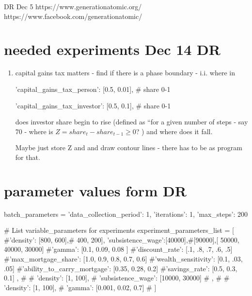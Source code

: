 DR Dec 5
https://www.generationatomic.org/
https://www.facebook.com/generationatomic/
\section{needed experiments Dec 14 DR}
\begin{enumerate}
    \item capital gains tax matters - find if there is a phase boundary - i.i. where in 

            'capital_gains_tax_person': [0.5, 0.01], # share 0-1

            'capital_gains_tax_investor': [0.5, 0.1], # share 0-1

            does investor share begin to rise (defined as ``for a given number of steps - say 70 - where is $Z=share_t - share_{t-1} \ge 0$? ) and where does it fall.

Maybe just store Z and and draw contour lines - there has to be as program for that.
\end{enumerate}
\section{parameter values form DR}
batch_parameters = {
            'data_collection_period': 1,
            'iterations': 1,
            'max_steps': 200
}

# List variable_parameters for experiments
    experiment_parameters_list = [
         {
            #'density': [800, 600],# 400, 200],
            'subsistence_wage':[40000],#[90000],[ 50000, 40000, 30000]
            #'gamma': [0.1, 0.09, 0.08 ]
            #'discount_rate': [.1, .8, .7, .6, .5]
            #'max_mortgage_share': [1.0, 0.9, 0.8, 0.7, 0.6]
            #'wealth_sensitivity': [0.1, .03, .05]
            #'ability_to_carry_mortgage': [0.35, 0.28, 0.2]
            #'savings_rate': [0.5, 0.3, 0.1]
        },
        # {
        #     'density': [1, 100],
        #     'subsistence_wage': [10000, 30000]
        # },
        # {
        #     'density': [1, 100],
        #     'gamma': [0.001, 0.02, 0.7]
        # }
    ]
    
